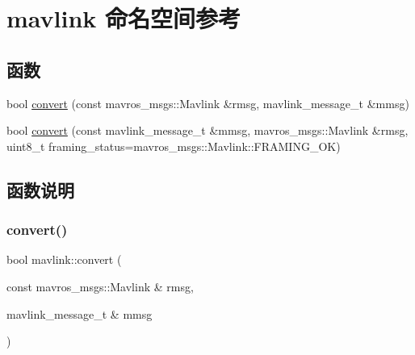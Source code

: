 \hypertarget{namespacemavlink}{}\section{mavlink 命名空间参考}
\label{namespacemavlink}
\subsection*{函数}
\begin{DoxyCompactItemize}
\item 
bool \hyperlink{namespacemavlink_a33d2555f5d1fabe24a8ad737b3b759af}{convert} (const mavros\+\_\+msgs\+::\+Mavlink \&rmsg, mavlink\+\_\+message\+\_\+t \&mmsg)
\item 
bool \hyperlink{namespacemavlink_af07de539a2994b99a182280e214ce0e3}{convert} (const mavlink\+\_\+message\+\_\+t \&mmsg, mavros\+\_\+msgs\+::\+Mavlink \&rmsg, uint8\+\_\+t framing\+\_\+status=mavros\+\_\+msgs\+::\+Mavlink\+::\+F\+R\+A\+M\+I\+N\+G\+\_\+\+OK)
\end{DoxyCompactItemize}


\subsection{函数说明}
\mbox{\label{namespacemavlink_a33d2555f5d1fabe24a8ad737b3b759af}} 
\subsubsection{\texorpdfstring{convert()}{convert()}\hspace{0.1cm}{\footnotesize\ttfamily [1/2]}}
{\footnotesize\ttfamily bool mavlink\+::convert (\begin{DoxyParamCaption}\item[{const mavros\+\_\+msgs\+::\+Mavlink \&}]{rmsg,  }\item[{mavlink\+\_\+message\+\_\+t \&}]{mmsg }\end{DoxyParamCaption})\hspace{0.3cm}{\ttfamily [inline]}}

\mbox{\label{namespacemavlink_af07de539a2994b99a182280e214ce0e3}} 
